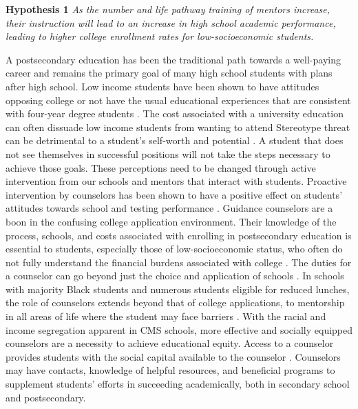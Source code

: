 
\textbf{Hypothesis 1} \textit{As the number and life pathway training of mentors increase, their instruction will lead to an increase in high school academic performance, leading to higher college enrollment rates for low-socioeconomic students.}

A postsecondary education has been the traditional path towards a well-paying career and remains the primary goal of many high school students with plans after high school. 
Low income students have been shown to have attitudes opposing college or not have the usual educational experiences that are consistent with four-year degree students \parencite[][]{king1996}. 
The cost associated with a university education can often dissuade low income students from wanting to attend \parencite[][]{king1996}
Stereotype threat can be detrimental to a student's self-worth and potential \parencite[][]{croizet1998}.
A student that does not see themselves in successful positions will not take the steps necessary to achieve those goals. 
These perceptions need to be changed through active intervention from our schools and mentors that interact with students. 
Proactive intervention by counselors has been shown to have a positive effect on students' attitudes towards school  and testing performance \parencite[][]{lee1993}.
Guidance counselors are a boon in the confusing college application environment. 
Their knowledge of the process, schools, and costs associated with enrolling in postsecondary education is essential to students, especially those of low-socioeconomic status, who often do not fully understand the financial burdens associated with college \parencite[][]{castleman2014intensive,deslonde2018high}. 
The duties for a counselor can go beyond just the choice and application of schools \parencite[][]{deslonde2018high}.  
In schools with majority Black students and numerous students eligible for reduced lunches, the role of counselors extends beyond that of college applications, to mentorship in all areas of life where the student may face barriers \parencite[][]{farmer2006}.
With the racial and income segregation apparent in CMS schools, more effective and socially equipped counselors are a necessity to achieve educational equity. 
Access to a counselor provides students with the social capital available to the counselor \parencite{tang2019high}. 
Counselors may have contacts, knowledge of helpful resources, and beneficial programs to supplement students' efforts in succeeding academically, both in secondary school and postsecondary. 

